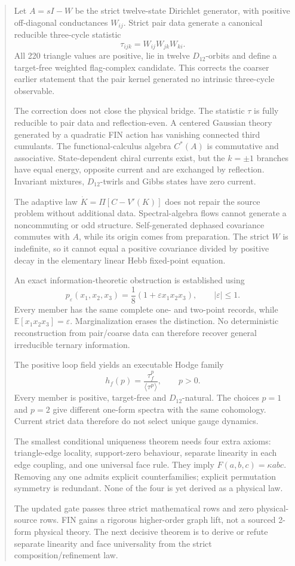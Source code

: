 \documentclass[11pt,a4paper]{article}
\begin{document}
\begin{abstract}
Let \(A=sI-W\) be the strict twelve-state Dirichlet generator, with positive
off-diagonal conductances \(W_{ij}\).  Strict pair data generate a canonical
reducible three-cycle statistic
\[
 \tau_{ijk}=W_{ij}W_{jk}W_{ki}.
\]
All 220 triangle values are positive, lie in twelve \(D_{12}\)-orbits and
define a target-free weighted flag-complex candidate.  This corrects the
coarser earlier statement that the pair kernel generated no intrinsic
three-cycle observable.

The correction does not close the physical bridge.  The statistic \(\tau\) is
fully reducible to pair data and reflection-even.  A centered Gaussian theory
generated by a quadratic FIN action has vanishing connected third cumulants.
The functional-calculus algebra \(C^*(A)\) is commutative and associative.
State-dependent chiral currents exist, but the \(k=\pm1\) branches have equal
energy, opposite current and are exchanged by reflection.  Invariant mixtures,
\(D_{12}\)-twirls and Gibbs states have zero current.

The adaptive law \(\dot K=\Pi[C-V'(K)]\) does not repair the source problem
without additional data.  Spectral-algebra flows cannot generate a
noncommuting or odd structure.  Self-generated dephased covariance commutes
with \(A\), while its origin comes from preparation.  The strict \(W\) is
indefinite, so it cannot equal a positive covariance divided by positive decay
in the elementary linear Hebb fixed-point equation.

An exact information-theoretic obstruction is established using
\[
 p_\varepsilon(x_1,x_2,x_3)
 =\frac18(1+\varepsilon x_1x_2x_3),\qquad |\varepsilon|\leq1.
\]
Every member has the same complete one- and two-point records, while
\(\mathbb E[x_1x_2x_3]=\varepsilon\).  Marginalization erases the distinction.
No deterministic reconstruction from pair/coarse data can therefore recover
general irreducible ternary information.

The positive loop field yields an executable Hodge family
\[
 h_f(p)=\frac{\tau_f^p}{\langle\tau^p\rangle},\qquad p>0.
\]
Every member is positive, target-free and \(D_{12}\)-natural.  The choices
\(p=1\) and \(p=2\) give different one-form spectra with the same cohomology.
Current strict data therefore do not select unique gauge dynamics.

The smallest conditional uniqueness theorem needs four extra axioms:
triangle-edge locality, support-zero behaviour, separate linearity in each
edge coupling, and one universal face rule.  They imply
\(F(a,b,c)=\kappa abc\).  Removing any one admits explicit counterfamilies;
explicit permutation symmetry is redundant.  None of the four is yet derived
as a physical law.

The updated gate passes three strict mathematical rows and zero
physical-source rows.  FIN gains a rigorous higher-order graph lift, not a
sourced 2-form physical theory.  The next decisive theorem is to derive or
refute separate linearity and face universality from the strict
composition/refinement law.
\end{abstract}
\end{document}
